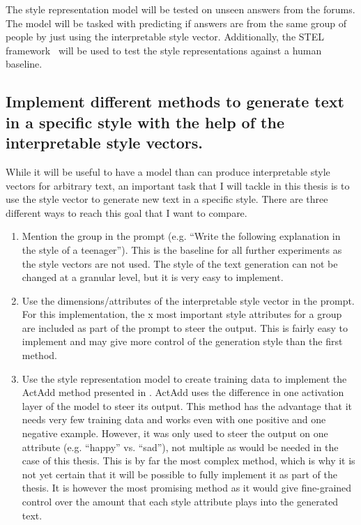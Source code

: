   The style representation model will be tested on unseen answers from the forums. The model will be tasked with predicting if answers are from the same group of people by just using the interpretable style vector. Additionally, the STEL framework~\cite{wegmann-nguyen-2021-capture} will be used to test the style representations against a human baseline.


   \subsection{Implement different methods to generate text in a specific style with the help of the interpretable style vectors.}
  While it will be useful to have a model than can produce interpretable style vectors for arbitrary text, an important task that I will tackle in this thesis is to use the style vector to generate new text in a specific style. There are three different ways to reach this goal that I want to compare.
  \begin{enumerate}
    \item Mention the group in the prompt (e.g. \enquote{Write the following explanation in the style of a teenager}). This is the baseline for all further experiments as the style vectors are not used. The style of the text generation can not be changed at a granular level, but it is very easy to implement.
    \item Use the dimensions/attributes of the interpretable style vector in the prompt. For this implementation, the x most important style attributes for a group are included as part of the prompt to steer the output. This is fairly easy to implement and may give more control of the generation style than the first method.
    \item Use the style representation model to create training data to implement the ActAdd method presented in \citet{turnerActivationAdditionSteering2024}. ActAdd uses the difference in one activation layer of the model to steer its output. This method has the advantage that it needs very few training data and works even with one positive and one negative example. However, it was only used to steer the output on one attribute (e.g. \enquote{happy} vs. \enquote{sad}), not multiple as would be needed in the case of this thesis. This is by far the most complex method, which is why it is not yet certain that it will be possible to fully implement it as part of the thesis. It is however the most promising method as it would give fine-grained control over the amount that each style attribute plays into the generated text.
  \end{enumerate}

